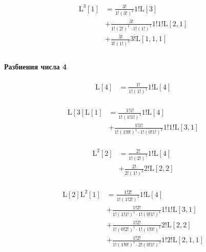 \begin{equation*} \begin{aligned}
  \mathrm{L}^3[1] &=
  \frac{3!}{1!(3!)^1}
  1! \mathrm{L}[3] \\ &
+ \frac{3!}{1!(2!)^1 \cdot 1!(1!)^1}
  1!1! \mathrm{L}[2, 1] \\ &
+ \frac{3!}{3!(1!)^3}
  3! \mathrm{L}[1, 1, 1] \\
\end{aligned} \end{equation*}

\paragraph{Разбиения числа 4}

\begin{equation*} \begin{aligned}
  \mathrm{L}[4] &=
  \frac{1!}{1!(1!)^1}
  1! \mathrm{L}[4] \\
\end{aligned} \end{equation*}

\begin{equation*} \begin{aligned}
  \mathrm{L}[3] \mathrm{L}[1] &=
  \frac{1!1!}{1!(1!1!)^1}
  1! \mathrm{L}[4] \\ &
+ \frac{1!1!}{1!(1!0!)^1 \cdot 1!(0!1!)^1}
  1!1! \mathrm{L}[3, 1] \\
\end{aligned} \end{equation*}

\begin{equation*} \begin{aligned}
  \mathrm{L}^2[2] &=
  \frac{2!}{1!(2!)^1}
  1! \mathrm{L}[4] \\ &
+ \frac{2!}{2!(1!)^2}
  2! \mathrm{L}[2, 2] \\
\end{aligned} \end{equation*}

\begin{equation*} \begin{aligned}
  \mathrm{L}[2] \mathrm{L}^2[1] &=
  \frac{1!2!}{1!(1!2!)^1}
  1! \mathrm{L}[4] \\ &
+ \frac{1!2!}{1!(1!1!)^1 \cdot 1!(0!1!)^1}
  1!1! \mathrm{L}[3, 1] \\ &
+ \frac{1!2!}{1!(0!2!)^1 \cdot 1!(1!0!)^1}
  2! \mathrm{L}[2, 2] \\ &
+ \frac{1!2!}{1!(1!0!)^1 \cdot 2!(0!1!)^2}
  1!2! \mathrm{L}[2, 1, 1] \\
\end{aligned} \end{equation*}


